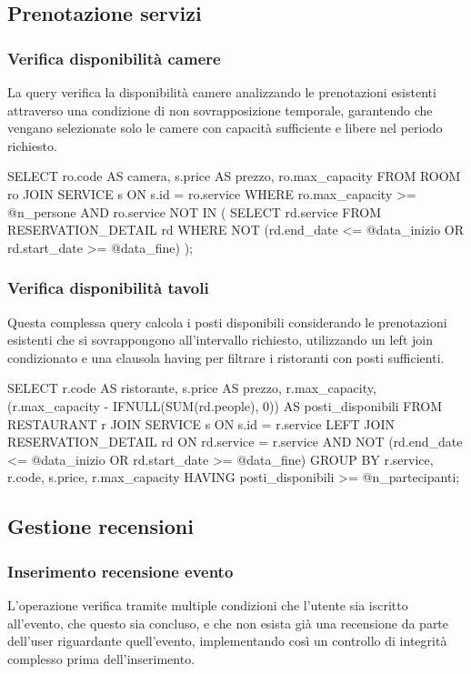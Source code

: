 \documentclass[a4paper,12pt]{report}
\begin{document}
\subsection{Prenotazione servizi} 

\subsubsection{Verifica disponibilità camere} 
La query verifica la disponibilità camere analizzando le prenotazioni esistenti attraverso una condizione di non sovrapposizione temporale, garantendo che vengano selezionate solo le camere con capacità sufficiente e libere nel periodo richiesto.

\begin{sqlcode}[caption={Query per la disponibilità camere}]
SELECT ro.code AS camera, s.price AS prezzo, ro.max_capacity 
FROM ROOM ro 
JOIN SERVICE s ON s.id = ro.service 
WHERE ro.max_capacity >= @n_persone 
  AND ro.service NOT IN (
    SELECT rd.service 
    FROM RESERVATION_DETAIL rd 
    WHERE NOT (rd.end_date <= @data_inizio OR rd.start_date >= @data_fine)
  );
\end{sqlcode}

\subsubsection{Verifica disponibilità tavoli} 
Questa complessa query calcola i posti disponibili considerando le prenotazioni esistenti che si sovrappongono all'intervallo richiesto, utilizzando un left join condizionato e una clausola having per filtrare i ristoranti con posti sufficienti.

\begin{sqlcode}[caption={Query per la disponibilità tavoli}]
SELECT r.code AS ristorante, s.price AS prezzo, r.max_capacity,
       (r.max_capacity - IFNULL(SUM(rd.people), 0)) AS posti_disponibili 
FROM RESTAURANT r 
JOIN SERVICE s ON s.id = r.service 
LEFT JOIN RESERVATION_DETAIL rd ON rd.service = r.service 
  AND NOT (rd.end_date <= @data_inizio OR rd.start_date >= @data_fine) 
GROUP BY r.service, r.code, s.price, r.max_capacity 
HAVING posti_disponibili >= @n_partecipanti;
\end{sqlcode}

\subsection{Gestione recensioni} 

\subsubsection{Inserimento recensione evento} 
L'operazione verifica tramite multiple condizioni che l'utente sia iscritto all'evento, che questo sia concluso, e che non esista già una recensione da parte dell'user riguardante quell'evento, implementando così un controllo di integrità complesso prima dell'inserimento.
\end{document}
